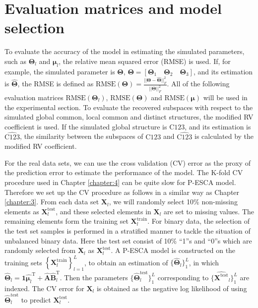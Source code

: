 \section{Evaluation matrices and model selection} \label{section:5.5}
To evaluate the accuracy of the model in estimating the simulated parameters, such as $\mathbf{\Theta}_l$ and $\bm{\mu}_l$, the relative mean squared error (RMSE) is used. If, for example, the simulated parameter is $\mathbf{\Theta}$, $\mathbf{\Theta} = [\mathbf{\Theta}_{1} \quad \mathbf{\Theta}_{2} \quad \mathbf{\Theta}_{3}]$, and its estimation is $\hat{\mathbf{\Theta}}$, the RMSE is defined as $\text{RMSE}(\mathbf{\Theta}) = \frac{||\mathbf{\Theta}-\hat{\mathbf{\Theta}}||_F^2}{||\mathbf{\Theta}||_F^2}$. All of the following evaluation matrices $\text{RMSE}(\mathbf{\Theta}_l)$, $\text{RMSE}(\mathbf{\Theta})$ and $\text{RMSE}(\bm{\mu})$ will be used in the experimental section. To evaluate the recovered subspaces with respect to the simulated global common, local common and distinct structures, the modified RV coefficient \cite{smilde2008matrix} is used. If the simulated global structure is $\text{C}123$, and its estimation is $\widehat{\text{C}123}$, the similarity between the subspaces of $\text{C}123$ and $\widehat{\text{C}123}$ is calculated by the modified RV coefficient.

For the real data sets, we can use the cross validation (CV) error as the proxy of the prediction error to estimate the performance of the model. The K-fold CV procedure used in Chapter \ref{chapter:4} can be quite slow for P-ESCA model. Therefore we set up the CV procedure as follows in a similar way as Chapter \ref{chapter:3}. From each data set $\mathbf{X}_l$, we will randomly select 10\% non-missing elements as $\mathbf{X}_l^{\text{test}}$, and these selected elements in $\mathbf{X}_l$ are set to missing values. The remaining elements form the training set $\mathbf{X}_l^{\text{train}}$. For binary data, the selection of the test set samples is performed in a stratified manner to tackle the situation of unbalanced binary data. Here the test set consist of 10\% ``1''s and ``0''s which are randomly selected from $\mathbf{X}_l$ as $\mathbf{X}_l^{\text{test}}$. A P-ESCA model is constructed on the training sets $\left\{\mathbf{X}_l^{\text{train}} \right\}_{l=1}^{L}$, to obtain an estimation of $\{\hat{\mathbf{\Theta}}_l \}_1^{L}$, in which $\hat{\mathbf{\Theta}}_l = \mathbf{1}\hat{\bm{\mu}_l}^{\text{T}} + \hat{\mathbf{A}}\hat{\mathbf{B}}_l^{\text{T}}$. Then the parameters $\{\hat{\mathbf{\Theta}}_l^{\text{test}} \}_1^{L}$ corresponding to $\{ \hat{\mathbf{X}^{\text{test}}}_l \}_1^{L}$ are indexed. The CV error for $\mathbf{X}_l$ is obtained as the negative log likelihood of using $\hat{\mathbf{\Theta}}_l^{\text{test}}$ to predict $\mathbf{X}_l^{\text{test}}$.

